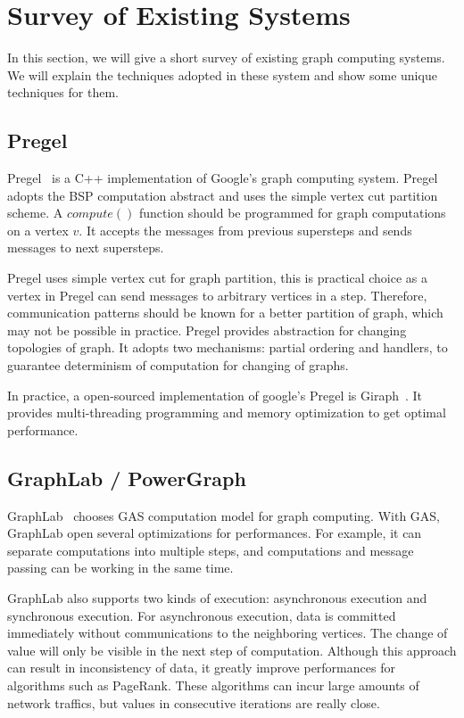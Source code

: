 \section{Survey of Existing Systems}
In this section, we will give a short survey of existing graph computing
systems. We will explain the techniques adopted in these system and
show some unique techniques for them.

\subsection{Pregel}
Pregel~\cite{pregel} is a C++ implementation of Google's graph computing system.
Pregel adopts the BSP computation abstract and uses the simple vertex cut
partition scheme. A $compute()$ function should be programmed for
graph computations on a vertex $v$. It accepts the messages from previous
supersteps and sends messages to next supersteps.

Pregel uses simple vertex cut for graph partition, this is practical
choice as a vertex in Pregel can send messages to arbitrary vertices
in a step. Therefore, communication patterns should be known for
a better partition of graph, which may not be possible in practice.
Pregel provides abstraction for changing topologies of graph.
It adopts two mechanisms: partial ordering and handlers, to guarantee
determinism of computation for changing of graphs.

In practice, a open-sourced implementation of google's Pregel is
Giraph~\cite{giraph}. It provides multi-threading programming and
memory optimization to get optimal performance.

\subsection{GraphLab / PowerGraph}
GraphLab~\cite{graphlab} chooses GAS computation model for graph
computing. With GAS, GraphLab open several optimizations
for performances. For example, it can separate computations
into multiple steps, and computations and message passing
can be working in the same time.

GraphLab also supports two kinds of execution: asynchronous
execution and synchronous execution.
For asynchronous execution, data is committed immediately
without communications to the neighboring vertices.
The change of value will only be visible in the next step
of computation. Although this approach can result in
inconsistency of data, it greatly improve performances
for algorithms such as PageRank. These algorithms
can incur large amounts of network traffics, but
values in consecutive iterations are really close.

